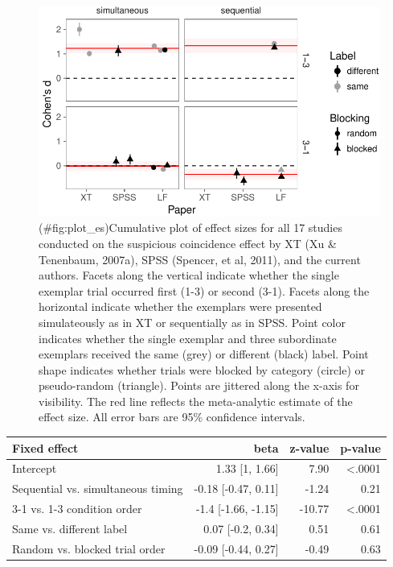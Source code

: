 \documentclass[english,floatsintext,man]{apa6}
\newcounter{author}
\theoremstyle{definition}
\theoremstyle{definition}
\theoremstyle{remark}
\begin{document}
\begin{figure}
\centering
\includegraphics{xtmem_files/figure-latex/plot_es-1.pdf}
\caption{(\#fig:plot\_es)Cumulative plot of effect sizes for all 17
studies conducted on the suspicious coincidence effect by XT (Xu \&
Tenenbaum, 2007a), SPSS (Spencer, et al, 2011), and the current authors.
Facets along the vertical indicate whether the single exemplar trial
occurred first (1-3) or second (3-1). Facets along the horizontal
indicate whether the exemplars were presented simulateously as in XT or
sequentially as in SPSS. Point color indicates whether the single
exemplar and three subordinate exemplars received the same (grey) or
different (black) label. Point shape indicates whether trials were
blocked by category (circle) or pseudo-random (triangle). Points are
jittered along the x-axis for visibility. The red line reflects the
meta-analytic estimate of the effect size. All error bars are 95\%
confidence intervals.}
\end{figure}

\begin{table}[!h]
\centering\begingroup\fontsize{12}{14}\selectfont

\begin{tabular}{lrrr}
\toprule
Fixed effect & beta & z-value & p-value\\
\midrule
Intercept & 1.33 [1, 1.66] & 7.90 & <.0001\\
Sequential vs. simultaneous timing & -0.18 [-0.47, 0.11] & -1.24 & 0.21\\
3-1 vs. 1-3 condition order & -1.4 [-1.66, -1.15] & -10.77 & <.0001\\
Same vs. different label & 0.07 [-0.2, 0.34] & 0.51 & 0.61\\
Random vs. blocked trial order & -0.09 [-0.44, 0.27] & -0.49 & 0.63\\
\bottomrule
\end{tabular}\endgroup
\end{table}
\end{document}
